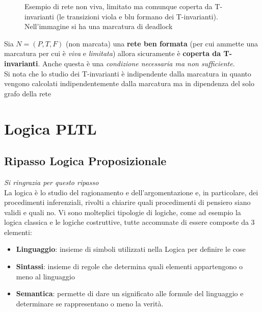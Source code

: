 \documentclass[a4paper,12pt, oneside]{book}
\begin{document}
\begin{teorema}
\begin{esempio}
\begin{figure}[H]
      \caption{Esempio di rete non viva, limitato ma comunque coperta da
        T-invarianti (le transizioni viola e blu formano dei
        T-invarianti). Nell'immagine si ha una marcatura di deadlock} 
    \end{figure}
  \end{esempio}
\end{teorema}
\begin{teorema}
  Sia $N=(P,T,F)$ (non marcata) una \textbf{rete ben formata} (per cui ammette
  una marcatura per cui è \emph{viva} e \emph{limitata}) allora sicuramente è
  \textbf{coperta da T-invarianti}. Anche questa è una \emph{condizione
    necessaria ma non sufficiente}.\\
  Si nota che lo studio dei T-invarianti è indipendente dalla marcatura in
  quanto vengono calcolati indipendentemente dalla marcatura ma in dipendenza
  del solo grafo della rete
\end{teorema}









\chapter{Logica PLTL}
\section{Ripasso Logica Proposizionale}
\emph{Si ringrazia
   per questo ripasso}\\ 
La logica è lo studio del ragionamento e dell’argomentazione e, in particolare,
dei procedimenti inferenziali, rivolti a chiarire quali	procedimenti di pensiero
siano validi e quali no. Vi sono molteplici tipologie di logiche, come ad
esempio la logica classica e le logiche costruttive, tutte accomunate di essere
composte da 3 elementi: 
\begin{itemize}
  \item \textbf{Linguaggio}: insieme di simboli utilizzati nella Logica per
  definire le cose 
  \item \textbf{Sintassi}: insieme di regole che determina quali elementi
  appartengono o meno al linguaggio 
  \item \textbf{Semantica}: permette di dare un significato alle formule del
  linguaggio e determinare se rappresentano o meno la verità.
\end{itemize}
\end{document}
